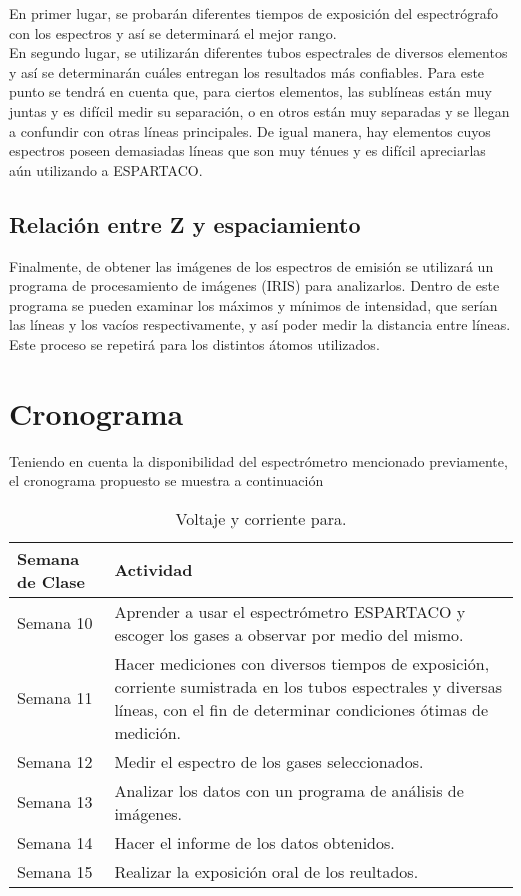 \documentclass[prb,aps,twocolumn,preprintnumbers,amsmath,amssymb]{revtex4}
\begin{document}
En primer lugar, se probarán diferentes tiempos de exposición del espectrógrafo con los espectros y así se determinará el mejor rango.\\

En segundo lugar, se utilizarán diferentes tubos espectrales de diversos elementos y así se determinarán cuáles entregan los resultados más confiables. Para este punto se tendrá en cuenta que, para ciertos elementos, las sublíneas están muy juntas y es difícil medir su separación, o en otros están muy separadas y se llegan a confundir con otras líneas principales. De igual manera, hay elementos cuyos espectros poseen demasiadas líneas que son muy ténues y es difícil apreciarlas aún utilizando a ESPARTACO.

\subsection{Relación entre Z y espaciamiento}
Finalmente, de obtener las imágenes de los espectros de emisión se utilizará un programa de procesamiento de imágenes (IRIS) para analizarlos. Dentro de este programa se pueden examinar los máximos y mínimos de intensidad, que serían las líneas y los vacíos respectivamente, y así poder medir la distancia entre líneas. Este proceso se repetirá para los distintos átomos utilizados.\\

\section{Cronograma}

Teniendo en cuenta la disponibilidad del espectrómetro mencionado previamente, el cronograma propuesto se muestra a continuación

\begin{table}[h!]
	\caption{\label{Tabla 1}Voltaje y corriente para.}
	\begin{ruledtabular}
		\begin{tabular}{|>{\centering\arraybackslash}p{3.0cm} | >{\centering\arraybackslash}p{5.5cm}|}
			Semana de Clase & Actividad\\
			\hline
			Semana 10 & Aprender a usar el espectrómetro ESPARTACO y escoger los gases a observar por medio del mismo. \\
			\hline
			Semana 11 & Hacer mediciones con diversos tiempos de exposición, corriente sumistrada en los tubos espectrales y diversas líneas, con el fin de determinar condiciones ótimas de medición. \\
			\hline
			Semana 12 & Medir el espectro de los gases seleccionados. \\
			\hline
			Semana 13 & Analizar los datos con un programa de análisis de imágenes. \\
			\hline
			Semana 14 & Hacer el informe de los datos obtenidos. \\
			\hline
			Semana 15 & Realizar la exposición oral de los reultados. \\
		\end{tabular}
	\end{ruledtabular}
\end{table}
\end{document}
